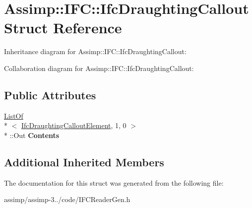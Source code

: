\hypertarget{struct_assimp_1_1_i_f_c_1_1_ifc_draughting_callout}{\section{Assimp\+:\+:I\+F\+C\+:\+:Ifc\+Draughting\+Callout Struct Reference}
\label{struct_assimp_1_1_i_f_c_1_1_ifc_draughting_callout}
}


Inheritance diagram for Assimp\+:\+:I\+F\+C\+:\+:Ifc\+Draughting\+Callout\+:


Collaboration diagram for Assimp\+:\+:I\+F\+C\+:\+:Ifc\+Draughting\+Callout\+:
\subsection*{Public Attributes}
\begin{DoxyCompactItemize}
\item 
\hypertarget{struct_assimp_1_1_i_f_c_1_1_ifc_draughting_callout_a58b4c2a9d76845c4c7628df598430bfc}{\hyperlink{struct_assimp_1_1_s_t_e_p_1_1_list_of}{List\+Of}\\*
$<$ \hyperlink{class_assimp_1_1_s_t_e_p_1_1_e_x_p_r_e_s_s_1_1_data_type}{Ifc\+Draughting\+Callout\+Element}, 1, 0 $>$\\*
\+::Out {\bfseries Contents}}\label{struct_assimp_1_1_i_f_c_1_1_ifc_draughting_callout_a58b4c2a9d76845c4c7628df598430bfc}

\end{DoxyCompactItemize}
\subsection*{Additional Inherited Members}


The documentation for this struct was generated from the following file\+:\begin{DoxyCompactItemize}
\item 
assimp/assimp-\/3../code/I\+F\+C\+Reader\+Gen.\+h\end{DoxyCompactItemize}
